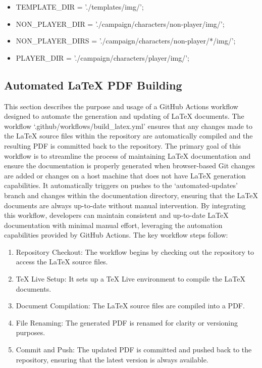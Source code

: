 \begin{itemize}
\item TEMPLATE\_DIR = './templates/img/';
\item NON\_PLAYER\_DIR = './campaign/characters/non-player/img/';
\item NON\_PLAYER\_DIRS = './campaign/characters/non-player/*/img/';
\item PLAYER\_DIR = './campaign/characters/player/img/';
\end{itemize}



\subsection{Automated LaTeX PDF Building}


This section describes the purpose and usage of a GitHub Actions workflow designed to automate the generation and updating of LaTeX documents. The workflow `.github/workflows/build\_latex.yml' ensures that any changes made to the LaTeX source files within the repository are automatically compiled and the resulting PDF is committed back to the repository. The primary goal of this workflow is to streamline the process of maintaining LaTeX documentation and ensure the documentation is properly generated when browser-based Git changes are added or changes on a host machine that does not have LaTeX generation capabilities. It automatically triggers on pushes to the `automated-updates' branch and changes within the documentation directory, ensuring that the LaTeX documents are always up-to-date without manual intervention. By integrating this workflow, developers can maintain consistent and up-to-date LaTeX documentation with minimal manual effort, leveraging the automation capabilities provided by GitHub Actions. The key workflow steps follow:

\begin{enumerate}
\item Repository Checkout: The workflow begins by checking out the repository to access the LaTeX source files.
\item TeX Live Setup: It sets up a TeX Live environment to compile the LaTeX documents.
\item Document Compilation: The LaTeX source files are compiled into a PDF.
\item File Renaming: The generated PDF is renamed for clarity or versioning purposes.
\item Commit and Push: The updated PDF is committed and pushed back to the repository, ensuring that the latest version is always available.
\end{enumerate}


